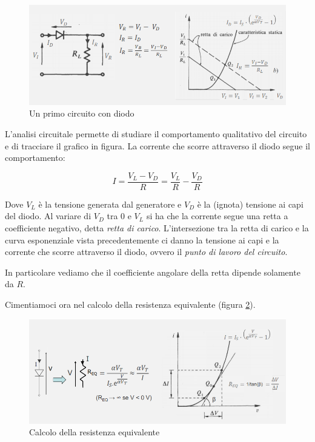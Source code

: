 \documentclass{article}
\begin{document}
\begin{figure}[h]
  \centering
  \includegraphics[scale=0.7]{IM_analisi_diodo}
  \caption{Un primo circuito con diodo}
  \label{Schema_analisi_diodo}
\end{figure}

L'analisi circuitale permette di studiare il comportamento qualitativo del circuito e di tracciare il grafico in figura. La corrente che scorre attraverso il diodo segue il comportamento:

\[I = \frac {V_L - V_D}{R} = \frac {V_L}{R} - \frac {V_D}{R}\]

Dove $V_L$ è la tensione generata dal generatore e $V_D$ è la (ignota) tensione ai capi del diodo. Al variare di $V_D$ tra $0$ e $V_L$ si ha che la corrente segue una retta a coefficiente negativo, detta \textit{retta di carico}. L'intersezione tra la retta di carico e la curva esponenziale vista precedentemente ci danno la tensione ai capi e la corrente che scorre attraverso il diodo, ovvero il \textit{punto di lavoro del circuito}.

In particolare vediamo che il coefficiente angolare della retta dipende solamente da $R$.

\vspace{3mm}

Cimentiamoci ora nel calcolo della resistenza equivalente (figura \ref{Schema_diodo_resistenza_equivalente}).

\begin{figure}[h]
  \centering
  \includegraphics[scale=0.6]{IM_diodo_resistenza_equivalente}
  \caption{Calcolo della resistenza equivalente}
  \label{Schema_diodo_resistenza_equivalente}
\end{figure}
\end{document}

